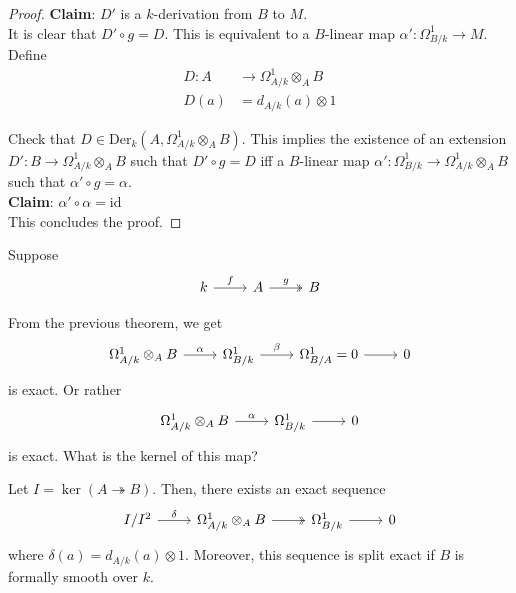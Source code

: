 \documentclass[oneside, 12pt, ]{scrbook}
\theoremstyle{theorem}
\begin{document}
\begin{proof}
\textbf{Claim}: $D'$ is a $k$-derivation from $B$ to $M$. \\

It is clear that $D' \circ g = D$. This is equivalent to a $B$-linear map $\alpha ' : \Omega_{B/k}^{1} \rightarrow M$. Define 
\begin{align*}
D: A &\rightarrow \Omega_{A/k}^{1} \otimes_{A} B \\
D(a) &= d_{A/k}(a) \otimes 1
\end{align*}

Check that $D\in \mathrm{Der}_{k}(A, \Omega_{A/k}^{1} \otimes_{A} B)$. This implies the existence of an extension $D' : B \rightarrow \Omega_{A/k}^{1} \otimes_{A} B$ such that $D' \circ g = D$ iff a $B$-linear map $\alpha ' : \Omega_{B/k}^{1} \rightarrow \Omega_{A/k}^{1} \otimes_{A} B$ such that $\alpha' \circ g = \alpha$. \\

\textbf{Claim}: $\alpha' \circ \alpha = \mathrm{id}$\\

This concludes the proof.
\end{proof}

Suppose \[\begin{tikzcd}
	{k } & A & B
	\arrow["g", two heads, from=1-2, to=1-3]
	\arrow["f", from=1-1, to=1-2]
\end{tikzcd}\] 

From the previous theorem, we get \[\begin{tikzcd}
	{\Omega_{A/k}^{1} \otimes_{A} B } & {\Omega_{B/k}^{1}} & {\Omega_{B/A}^{1}}=0 & 0
	\arrow["\alpha", from=1-1, to=1-2]
	\arrow["\beta", from=1-2, to=1-3]
	\arrow[from=1-3, to=1-4]
\end{tikzcd}\] is exact. Or rather \[\begin{tikzcd}
	{\Omega_{A/k}^{1} \otimes_{A} B } & {\Omega_{B/k}^{1}} &  0
	\arrow["\alpha", from=1-1, to=1-2]
	\arrow[from=1-2, to=1-3]
\end{tikzcd}\] is exact. What is the kernel of this map? 

\begin{theorem}
Let $I = \ker(A \twoheadrightarrow B)$. Then, there exists an exact sequence \[\begin{tikzcd}
	{I/I^2} & {\Omega_{A/k}^{1} \otimes_{A} B} & {\Omega_{B/k}^{1}} & 0
	\arrow[two heads, from=1-2, to=1-3]
	\arrow["\delta", from=1-1, to=1-2]
	\arrow[from=1-3, to=1-4]
\end{tikzcd}\] where $\delta(a) = d_{A/k} (a) \otimes 1$. Moreover, this sequence is split exact if $B$ is formally smooth over $k$.
\end{theorem}
\end{document}
